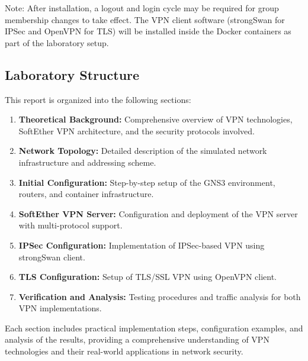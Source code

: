 Note: After installation, a logout and login cycle may be required for group membership changes to take effect. The VPN client software (strongSwan for IPSec and OpenVPN for TLS) will be installed inside the Docker containers as part of the laboratory setup.

\subsection{Laboratory Structure}

This report is organized into the following sections:

\begin{enumerate}
    \item \textbf{Theoretical Background:} Comprehensive overview of VPN technologies, SoftEther VPN architecture, and the security protocols involved.
    
    \item \textbf{Network Topology:} Detailed description of the simulated network infrastructure and addressing scheme.
    
    \item \textbf{Initial Configuration:} Step-by-step setup of the GNS3 environment, routers, and container infrastructure.
    
    \item \textbf{SoftEther VPN Server:} Configuration and deployment of the VPN server with multi-protocol support.
    
    \item \textbf{IPSec Configuration:} Implementation of IPSec-based VPN using strongSwan client.
    
    \item \textbf{TLS Configuration:} Setup of TLS/SSL VPN using OpenVPN client.
    
    \item \textbf{Verification and Analysis:} Testing procedures and traffic analysis for both VPN implementations.
    
\end{enumerate}

Each section includes practical implementation steps, configuration examples, and analysis of the results, providing a comprehensive understanding of VPN technologies and their real-world applications in network security.

